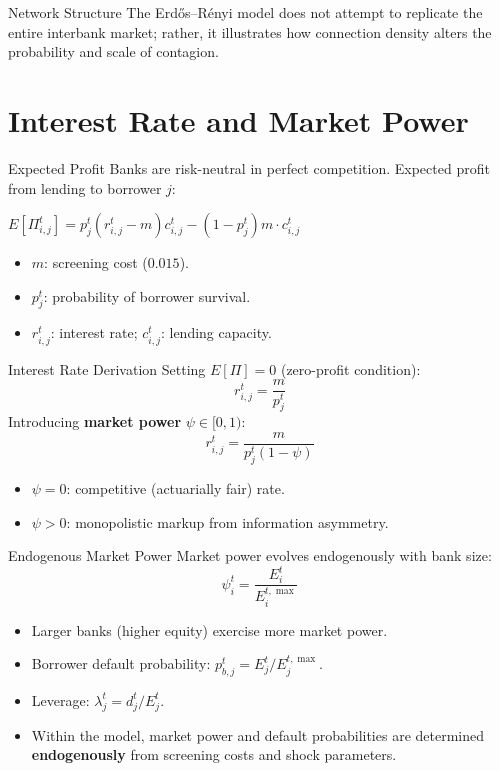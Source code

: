 \begin{frame}{Network Structure}
The Erd\H{o}s--R\'enyi model does not attempt to replicate the entire interbank market; rather, it illustrates how connection density alters the probability and scale of contagion.
\end{frame}


\section{Interest Rate and Market Power}\label{sec:4}


\begin{frame}{Expected Profit}
  Banks are risk-neutral in perfect competition. Expected profit from lending to borrower $j$:
  \begin{block}{}
    $E[\Pi_{i,j}^t] = p_j^t (r_{i,j}^t - m) c_{i,j}^t - (1 - p_j^t) m \cdot c_{i,j}^t$
  \end{block}
  \begin{itemize}
    \item $m$: screening cost ($0.015$).
    \item $p_j^t$: probability of borrower survival.
    \item $r_{i,j}^t$: interest rate; $c_{i,j}^t$: lending capacity.
  \end{itemize}
\end{frame}

\begin{frame}{Interest Rate Derivation}
  Setting $E[\Pi] = 0$ (zero-profit condition):
  \[
    r_{i,j}^t = \frac{m}{p_j^t}
  \]
  Introducing \textbf{market power} $\psi \in [0,1)$:
  \[
    \boxed{r_{i,j}^t = \frac{m}{p_j^t (1 - \psi)}}
  \]
  \begin{itemize}
    \item $\psi = 0$: competitive (actuarially fair) rate.
    \item $\psi > 0$: monopolistic markup from information asymmetry.
  \end{itemize}
\end{frame}

\begin{frame}{Endogenous Market Power}
  Market power evolves endogenously with bank size:
  \[
    \psi_i^t = \frac{E_i^t}{E_i^{t,\max}}
  \]
  \begin{itemize}
    \item Larger banks (higher equity) exercise more market power.
    \item Borrower default probability:
    $p_{b,j}^t = E_j^t / E_j^{t,\max}$.
    \item Leverage: $\lambda_j^t = d_j^t / E_j^t$.
    \item Within the model, market power and default probabilities are determined \textbf{endogenously} from screening costs and shock parameters.
  \end{itemize}
\end{frame}



